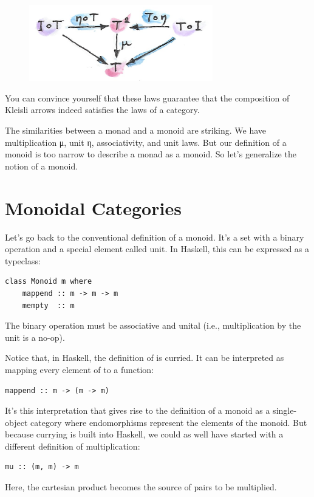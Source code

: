 \begin{figure}[H]
\centering
\includegraphics[width=80mm]{images/unitlawcomp-1.png}
\end{figure}

\noindent
You can convince yourself that these laws guarantee that the composition
of Kleisli arrows indeed satisfies the laws of a category.

The similarities between a monad and a monoid are striking. We have
multiplication μ, unit η, associativity, and unit laws. But our
definition of a monoid is too narrow to describe a monad as a monoid. So
let's generalize the notion of a monoid.

\section{Monoidal Categories}\label{monoidal-categories}

Let's go back to the conventional definition of a monoid. It's a set
with a binary operation and a special element called unit. In Haskell,
this can be expressed as a typeclass:

\begin{verbatim}
class Monoid m where
    mappend :: m -> m -> m
    mempty  :: m
\end{verbatim}
The binary operation  must be associative and unital
(i.e., multiplication by the unit  is a no-op).

Notice that, in Haskell, the definition of  is curried.
It can be interpreted as mapping every element of  to a
function:

\begin{verbatim}
mappend :: m -> (m -> m)
\end{verbatim}
It's this interpretation that gives rise to the definition of a monoid
as a single-object category where endomorphisms
 represent the elements of the monoid.
But because currying is built into Haskell, we could as well have
started with a different definition of multiplication:

\begin{verbatim}
mu :: (m, m) -> m
\end{verbatim}
Here, the cartesian product  becomes the source of pairs
to be multiplied.

